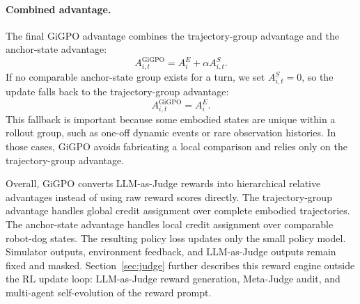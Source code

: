 \paragraph{Combined advantage.}
The final GiGPO advantage combines the trajectory-group advantage and the anchor-state advantage:
\begin{equation}
A_{i,t}^{\mathrm{GiGPO}}
=
A_i^{E}
+
\alpha A_{i,t}^{S}.
\end{equation}
If no comparable anchor-state group exists for a turn, we set $A_{i,t}^{S}=0$, so the update falls back to the trajectory-group advantage:
\begin{equation}
A_{i,t}^{\mathrm{GiGPO}}
=
A_i^{E}.
\end{equation}
This fallback is important because some embodied states are unique within a rollout group, such as one-off dynamic events or rare observation histories. In those cases, GiGPO avoids fabricating a local comparison and relies only on the trajectory-group advantage.

Overall, GiGPO converts LLM-as-Judge rewards into hierarchical relative advantages instead of using raw reward scores directly. The trajectory-group advantage handles global credit assignment over complete embodied trajectories. The anchor-state advantage handles local credit assignment over comparable robot-dog states. The resulting policy loss updates only the small policy model. Simulator outputs, environment feedback, and LLM-as-Judge outputs remain fixed and masked. Section~\ref{sec:judge} further describes this reward engine outside the RL update loop: LLM-as-Judge reward generation, Meta-Judge audit, and multi-agent self-evolution of the reward prompt.
